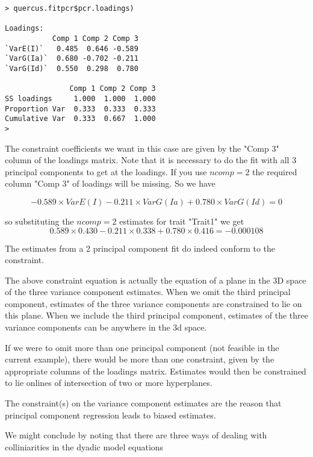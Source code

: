 \documentclass[titlepage]{article}  %
\begin{document}
\begin{verbatim}
> quercus.fitpcr$pcr.loadings)

Loadings:
           Comp 1 Comp 2 Comp 3
`VarE(I)`   0.485  0.646 -0.589
`VarG(Ia)`  0.680 -0.702 -0.211
`VarG(Id)`  0.550  0.298  0.780

               Comp 1 Comp 2 Comp 3
SS loadings     1.000  1.000  1.000
Proportion Var  0.333  0.333  0.333
Cumulative Var  0.333  0.667  1.000
> 
\end{verbatim}

 The constraint coefficients we want in this case are given by the "Comp 3" column of the loadings matrix. Note that it is necessary to do the fit with all 3 principal components  to get at the loadings. If you use $ncomp=2$ the required column "Comp 3" of loadings will be missing. So we have

\begin{displaymath}
-0.589 \times VarE(I) -0.211 \times VarG(Ia) +0.780 \times VarG(Id) = 0
\end{displaymath}

so substituting the $ncomp=2$ estimates for trait "Trait1" we get
\begin{displaymath}
0.589 \times 0.430  -0.211 \times 0.338 +0.780 \times 0.416 = -0.000108
\end{displaymath}

The estimates from a 2 principal component fit do indeed conform to the constraint.

The above constraint equation is actually the equation of a plane in the 3D space of the three variance component estimates. When we omit the third principal component, estimates of the three variance components are constrained to lie on this plane. When we include the third principal component, estimates of the three variance components can be anywhere in the 3d space. 

If we were to omit more than one principal component (not feasible in the current example), there would be more than one constraint, given by the appropriate columns of the loadings matrix. Estimates would then be constrained to lie onlines of intersection of two or more hyperplanes.

The constraint(s) on the variance component estimates are the reason that principal component regression leads to biased estimates.

We might conclude by noting that there are three ways of dealing with colliniarities in the dyadic model equations
\end{document}
